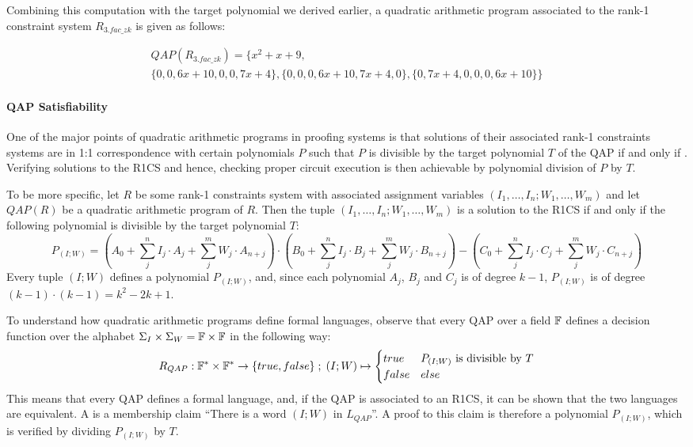 \begin{example}
Combining this computation with the target polynomial we derived earlier, a quadratic arithmetic program associated to the rank-1 constraint system $R_{3.fac\_zk}$ is given as follows:

\begin{equation}\label{QAP-R3-fac-zk}
\begin{split}
QAP(R_{3.fac\_zk}) =\{x^{2}+x+9,\\
 \{0,0,6x+10,0,0,7x+4\},\{0,0,0,6x+10,7x+4,0\},\{0,7x+4,0,0,0,6x+10\}\}
\end{split}
\end{equation}
\end{example}
\paragraph{QAP Satisfiability} One of the major points of quadratic arithmetic programs in proofing systems is that solutions of their associated rank-1 constraints systems are in 1:1 correspondence with certain polynomials $P$ such that $P$ is divisible by the target polynomial $T$ of the QAP if and only if . Verifying solutions to the R1CS and hence, checking proper circuit execution is then achievable by polynomial division of $P$ by $T$.

To be more specific, let $R$ be some rank-1 constraints system with associated assignment variables $(I_1,\ldots,I_n; W_1,\ldots, W_m)$ and let $QAP(R)$ be a quadratic arithmetic program of $R$. Then the tuple $(I_1,\ldots,I_n; W_1,\ldots, W_m)$ is a solution to the R1CS if and only if the following polynomial is divisible by the target polynomial $T$:
\begin{equation}\label{polynomial-P-IW}
P_{(I;W)} = \scriptstyle \left(A_0 + \sum_{j}^n I_j\cdot A_j + \sum_{j}^m W_j\cdot A_{n+j} \right) \cdot \left(B_0 + \sum_{j}^n I_j\cdot B_j + \sum_{j}^m W_j\cdot B_{n+j} \right) 
-\left(C_0 + \sum_{j}^n I_j\cdot C_j + \sum_{j}^m W_j\cdot C_{n+j} \right)
\end{equation}
Every tuple $(I;W)$ defines a polynomial $P_{(I;W)}$, and, since each polynomial $A_j$, $B_j$ and $C_j$ is of degree $k-1$, $P_{(I;W)}$ is of degree $(k-1)\cdot (k-1)= k^2 -2k +1$. 

To understand how quadratic arithmetic programs define formal languages, observe that every QAP over a field $\mathbb{F}$ defines a decision function over the alphabet $\Sigma_I \times \Sigma_W = \mathbb{F} \times \mathbb{F}$ in the following way:
\begin{equation}
R_{QAP} : \mathbb{F}^* \times \mathbb{F}^* \to \{true, false\}\;;\;
(I;W) \mapsto
\begin{cases}
true & P_{(I;W)} \text{ is divisible by } T\\
false & else
\end{cases}
\end{equation}
This means that every QAP defines a formal language, and, if the QAP is associated to an R1CS, it can be shown that the two languages are equivalent. A  is a membership claim ``There is a word $(I;W)$ in $L_{QAP}$''. A proof to this claim is therefore a polynomial $P_{(I;W)}$, which is verified by dividing $P_{(I;W)}$ by $T$.

